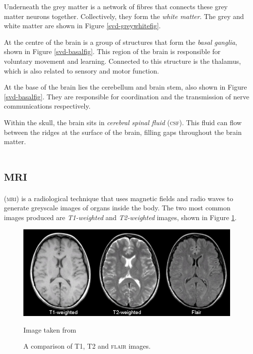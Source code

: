 Underneath the grey matter is a network of fibres that connects these grey matter neurons together. Collectively, they form the \textit{white matter}. The grey and white matter are shown in Figure \ref{svd-greywhitefig}.

At the centre of the brain is a group of structures that form the \textit{basal ganglia}, shown in Figure \ref{svd-basalfig}. This region of the brain is responsible for voluntary movement and learning. Connected to this structure is the thalamus, which is also related to sensory and motor function.

At the base of the brain lies the cerebellum and brain stem, also shown in Figure \ref{svd-basalfig}. They are responsible for coordination and the transmission of nerve communications respectively.

Within the skull, the brain sits in \textit{cerebral spinal fluid} (\textsc{csf}). This fluid can flow between the ridges  at the surface of the brain, filling gaps throughout the brain matter.


\section{\textsc{mri}}\label{svd-MRI}

(\textsc{mri}) is a radiological technique that uses magnetic fields and radio waves to generate greyscale images of organs inside the body. The two most common images produced are \textit{T1-weighted} and \textit{T2-weighted} images, shown in Figure \ref{svd-t1-vs-t2}.

\begin{figure}[ht]
	\centering
	\includegraphics[width=\textwidth]{Images/2_t1_t2_flair.jpg}
	\caption{A comparison of T1, T2 and \textsc{flair} images.}
	\small Image taken from \cite{Preston2006}
	\label{svd-t1-vs-t2}
\end{figure}

